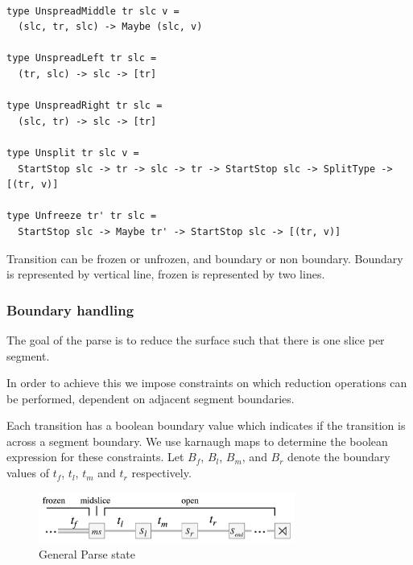 \documentclass[12pt,a4paper,twoside,openright]{report}
\theoremstyle{definition}
\begin{document}
\begin{lstlisting}

type UnspreadMiddle tr slc v = 
  (slc, tr, slc) -> Maybe (slc, v)

type UnspreadLeft tr slc = 
  (tr, slc) -> slc -> [tr]

type UnspreadRight tr slc = 
  (slc, tr) -> slc -> [tr]

type Unsplit tr slc v =
  StartStop slc -> tr -> slc -> tr -> StartStop slc -> SplitType -> [(tr, v)]

type Unfreeze tr' tr slc =
  StartStop slc -> Maybe tr' -> StartStop slc -> [(tr, v)]
\end{lstlisting}

Transition can be frozen or unfrozen, and boundary or non boundary. Boundary is represented by vertical line, frozen is represented by two lines.

\subsubsection{Boundary handling}

The goal of the parse is to reduce the surface such that there is one slice per segment. 

In order to achieve this we impose constraints on which reduction operations can be performed, dependent on adjacent segment boundaries. 

Each transition has a boolean boundary value which indicates if the transition is across a segment boundary. We use karnaugh maps to determine the boolean expression for these constraints. 
Let $B_f$, $B_l$, $B_m$, and $B_r$ denote the boundary values of $t_f$, $t_l$, $t_m$ and $t_r$ respectively.

\begin{figure}[h]
  \begin{center}
    \includegraphics[width=0.75\textwidth]{impl/boundarydiagram/diag}
  \end{center}
  \caption{General Parse state}
  \label{fig:parseStateBound}
\end{figure}
\end{document}
